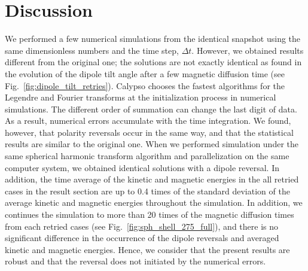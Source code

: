\section{Discussion}
\label{section:discussion}

{\color{teal}
We performed a few numerical simulations from the identical snapshot using the same dimensionless numbers and the time step, $\Delta t$.
}
However, we obtained results different from the original one; the solutions are not exactly identical
as found in the evolution of the dipole tilt angle after a few magnetic diffusion time (see Fig.~\ref{fig:dipole_tilt_retries}). 
Calypso chooses the fastest algorithms for the Legendre and Fourier transforms at the initialization process in numerical simulations. 
The different order of summation can change the last digit of data. 
As a result, numerical errors accumulate with the time integration. 
We found, however, that polarity reversals occur in the same way, and that the statistical results are similar to the original one.
{\color{blue} 
When we performed simulation under the same spherical harmonic transform algorithm and parallelization on the same computer system, we obtained identical solutions with a dipole reversal. In addition, the time average of the kinetic and magnetic energies in the all retried cases in the result section are up to 0.4 times of the standard deviation of the average kinetic and magnetic energies throughout the simulation. 
{\color{magenta}
In addition, we continues the simulation to more than 20 times of the magnetic diffusion times from each retried cases (see Fig.~\ref{fig:sph_shell_275_full}), and there is no significant difference in the occurrence of the dipole reversals and averaged kinetic and magnetic energies.
}
{\color{teal}
Hence, we consider that the present results are robust and that the reversal does not initiated by the numerical errors.
}
}

